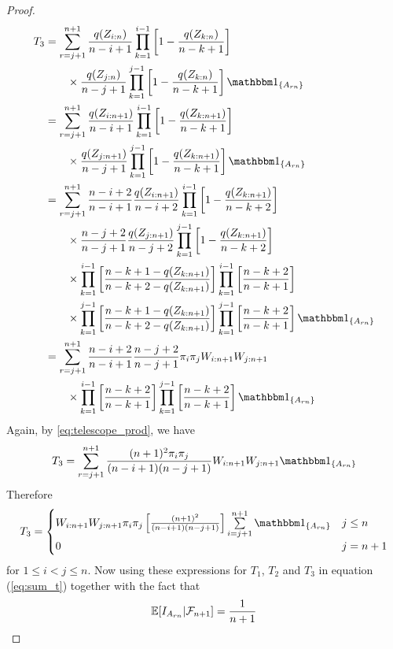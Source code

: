 \begin{proof}
\begin{align*}
	T_3 &= \sum\limits_{r=j+1}^{n+1} \frac{q(Z_{i:n})}{n-i+1} \prod\limits_{k=1}^{i-1} \left[1-\frac{q(Z_{k:n})}{n-k+1}\right]\\
	&\qquad \times \frac{q(Z_{j:n})}{n-j+1} \prod\limits_{k=1}^{j-1} \left[1-\frac{q(Z_{k:n})}{n-k+1}\right]\I{A_{rn}}\\
	&= \sum\limits_{r=j+1}^{n+1} \frac{q(Z_{i:n+1})}{n-i+1} \prod\limits_{k=1}^{i-1} \left[1-\frac{q(Z_{k:n+1})}{n-k+1}\right]\\
	&\qquad \times \frac{q(Z_{j:n+1})}{n-j+1} \prod\limits_{k=1}^{j-1} \left[1-\frac{q(Z_{k:n+1})}{n-k+1}\right]\I{A_{rn}}\\	
	&= \sum\limits_{r=j+1}^{n+1} \frac{n-i+2}{n-i+1}\frac{q(Z_{i:n+1})}{n-i+2} \prod\limits_{k=1}^{i-1} \left[1-\frac{q(Z_{k:n+1})}{n-k+2}\right]\\
	&\qquad \times \frac{n-j+2}{n-j+1}\frac{q(Z_{j:n+1})}{n-j+2} \prod\limits_{k=1}^{j-1} \left[1-\frac{q(Z_{k:n+1})}{n-k+2}\right]\\	
	&\qquad \times \prod\limits_{k=1}^{i-1} \left[\frac{n-k+1-q(Z_{k:n+1})}{n-k+2-q(Z_{k:n+1})}\right]\prod\limits_{k=1}^{i-1} \left[\frac{n-k+2}{n-k+1}\right]\\
	&\qquad \times \prod\limits_{k=1}^{j-1} \left[\frac{n-k+1-q(Z_{k:n+1})}{n-k+2-q(Z_{k:n+1})}\right]\prod\limits_{k=1}^{j-1} \left[\frac{n-k+2}{n-k+1}\right]\I{A_{rn}}\\
	&= \sum\limits_{r=j+1}^{n+1} \frac{n-i+2}{n-i+1}\frac{n-j+2}{n-j+1}\pi_i\pi_j \wn{i}{n+1}\wn{j}{n+1}\\	
	&\qquad \times \prod\limits_{k=1}^{i-1} \left[\frac{n-k+2}{n-k+1}\right] \prod\limits_{k=1}^{j-1} \left[\frac{n-k+2}{n-k+1}\right]\I{A_{rn}}\\
\end{align*}
%
Again, by \eqref{eq:telescope_prod}, we have
\begin{align*}
T_3 &= \sum\limits_{r=j+1}^{n+1} \frac{(n+1)^2\pi_i\pi_j}{(n-i+1)(n-j+1)}\wn{i}{n+1}\wn{j}{n+1}\I{A_{rn}}\\	
\end{align*}
%
Therefore
\[T_3 = \begin{cases} 
      \wn{i}{n+1}\wn{j}{n+1}\pi_i\pi_j\left[\frac{(n+1)^2}{(n-i+1)(n-j+1)}\right]\sum\limits_{i=j+1}^{n+1}\I{A_{rn}} & j\leq n \\
			0 & j=n+1
   \end{cases}
\]
for $1\leq i<j\leq n$.
%
Now using these expressions for $T_1$, $T_2$ and $T_3$ in equation (\ref{eq:sum_t}) together with the fact that 
$$\mathbb{E}[I_{A_{rn}}|\mathcal{F}_{n+1}] = \frac{1}{n+1}$$

\end{proof}
